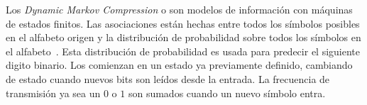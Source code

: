 
 Los \emph{Dynamic Markov Compression} o \DMC son modelos de información con máquinas de estados finitos. Las asociaciones están hechas entre todos los símbolos posibles en el alfabeto origen y la distribución de probabilidad sobre todos los símbolos en el alfabeto~\cite{PenaSordo2015}. 
 Esta distribución de probabilidad es usada para predecir el siguiente digito binario. Los \DMC comienzan en un estado ya previamente definido, cambiando de estado cuando nuevos bits son leídos desde la entrada. La frecuencia de transmisión ya sea un $0$ o $1$ son sumados cuando un nuevo símbolo entra. %


